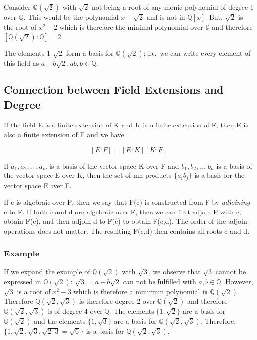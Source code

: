 Consider \(\mathbb{Q}(\sqrt{2})\) with \(\sqrt{2}\) not being a root of
any monic polynomial of degree 1 over \(\mathbb{Q}\). This would be the
polynomial \(x-\sqrt{2}\) and is not in \(\mathbb{Q}[x]\). But,
\(\sqrt{2}\) is the root of \(x^2-2\) which is therefore the minimal
polynomial over \(\mathbb{Q}\) and therefore
\([\mathbb{Q}(\sqrt{2}) : \mathbb{Q}] = 2\).

The elements \(1, \sqrt{2}\) form a basis for \(\mathbb{Q}(\sqrt{2})\);
i.e.~we can write every element of this field as
\(a + b\sqrt{2}, ab,b \in \mathbb{Q}\).

\subsection{Connection between Field Extensions and
Degree}\label{connection-between-field-extensions-and-degree}

If the field E is a finite extension of K and K is a finite extension of
F, then E is also a finite extension of F and we have

\[
[E:F] = [E:K] [K:F]
\]

If \(a_1, a_2, \ldots, a_m\) is a basis of the vector space K over F and
\(b_1, b_2, \ldots, b_n\) is a basis of the vector space E over K, then
the set of mn products \(\{a_i b_j\}\) is a basis for the vector space E
over F.

If c is algebraic over F, then we say that F(c) is constructed from F by
\emph{adjoining} c to F. If both c and d are algebraic over F, then we
can first adjoin F with c, obtain F(c), and then adjoin d to F(c) to
obtain F(c,d). The order of the adjoin operations does not matter. The
resulting F(c,d) then contains all roots c and d.

\subsubsection{Example}\label{example-1}

If we expand the example of \(\mathbb{Q}(\sqrt{2})\) with \(\sqrt{3}\),
we observe that \(\sqrt{3}\) cannot be expressed in
\(\mathbb{Q}(\sqrt{2})\): \(\sqrt{3} = a + b\sqrt{2}\) can not be
fulfilled with \(a,b \in \mathbb{Q}\). However, \(\sqrt{3}\) is a root
of \(x^2-3\) which is therefore a minimum polynomial in
\(\mathbb{Q}(\sqrt{2})\). Therefore \(\mathbb{Q}(\sqrt{2}, \sqrt{3})\)
is therefore degree 2 over \(\mathbb{Q}(\sqrt{2})\) and therefore
\(\mathbb{Q}(\sqrt{2}, \sqrt{3})\) is of degree 4 over \(\mathbb{Q}\).
The elements \(\{1, \sqrt{2}\}\) are a basis for
\(\mathbb{Q}(\sqrt{2})\) and the elements \(\{1, \sqrt{3}\}\) are a
basis for \(\mathbb{Q}(\sqrt{2}, \sqrt{3})\). Therefore,
\(\{1, \sqrt{2}, \sqrt{3}, \sqrt{2 \cdot 3} = \sqrt{6}\}\) is a basis
for \(\mathbb{Q}(\sqrt{2}, \sqrt{3})\).

